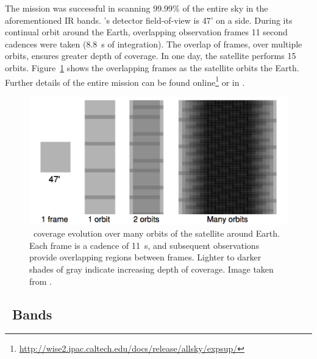 
    The mission was successful in scanning 99.99\% of the entire sky in the aforementioned IR bands. \WS's detector field-of-view is 47' on a side. During its continual orbit around the Earth, overlapping observation frames 11 second cadences were taken (8.8~s of integration). The overlap of frames, over multiple orbits, ensures greater depth of coverage. In one day, the satellite performs 15 orbits. Figure~\ref{fig:wise_scan_plan} shows the overlapping frames as the satellite orbits the Earth. Further details of the entire mission can be found online\footnote{\url{http://wise2.ipac.caltech.edu/docs/release/allsky/expsup/}} or in \citet{Wright2010}. 

    \begin{figure}
    \centering
    \includegraphics[width=\textwidth]{Ch2/wise_scan_plan}
    \caption[\WS\ Sky Coverage]{\WS\ coverage evolution over many orbits of the satellite around Earth. Each frame is a cadence of 11~s, and subsequent observations provide overlapping regions between frames. Lighter to darker shades of gray indicate increasing depth of coverage. Image taken from \citet{Wright2010}.}
    \label{fig:wise_scan_plan}
    \end{figure}
    
    
   
   
    \subsection{\WS\ Bands}\label{sec:wise_bands}


